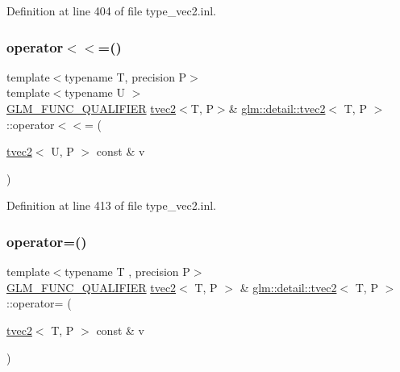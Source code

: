 Definition at line 404 of file type\+\_\+vec2.\+inl.

\mbox{\label{structglm_1_1detail_1_1tvec2_a501a88775ae24755acb58b2572cc3ec9}} 
\subsubsection{\texorpdfstring{operator$<$$<$=()}{operator<<=()}\hspace{0.1cm}{\footnotesize\ttfamily [4/4]}}
{\footnotesize\ttfamily template$<$typename T, precision P$>$ \\
template$<$typename U $>$ \\
\hyperlink{setup_8hpp_a33fdea6f91c5f834105f7415e2a64407}{G\+L\+M\+\_\+\+F\+U\+N\+C\+\_\+\+Q\+U\+A\+L\+I\+F\+I\+ER} \hyperlink{structglm_1_1detail_1_1tvec2}{tvec2}$<$T, P$>$\& \hyperlink{structglm_1_1detail_1_1tvec2}{glm\+::detail\+::tvec2}$<$ T, P $>$\+::operator$<$$<$= (\begin{DoxyParamCaption}\item[{\hyperlink{structglm_1_1detail_1_1tvec2}{tvec2}$<$ U, P $>$ const \&}]{v }\end{DoxyParamCaption})}



Definition at line 413 of file type\+\_\+vec2.\+inl.

\mbox{\label{structglm_1_1detail_1_1tvec2_aa28bba513156a189b4232806e7b6858e}} 
\subsubsection{\texorpdfstring{operator=()}{operator=()}\hspace{0.1cm}{\footnotesize\ttfamily [1/3]}}
{\footnotesize\ttfamily template$<$typename T , precision P$>$ \\
\hyperlink{setup_8hpp_a33fdea6f91c5f834105f7415e2a64407}{G\+L\+M\+\_\+\+F\+U\+N\+C\+\_\+\+Q\+U\+A\+L\+I\+F\+I\+ER} \hyperlink{structglm_1_1detail_1_1tvec2}{tvec2}$<$ T, P $>$ \& \hyperlink{structglm_1_1detail_1_1tvec2}{glm\+::detail\+::tvec2}$<$ T, P $>$\+::operator= (\begin{DoxyParamCaption}\item[{\hyperlink{structglm_1_1detail_1_1tvec2}{tvec2}$<$ T, P $>$ const \&}]{v }\end{DoxyParamCaption})}



